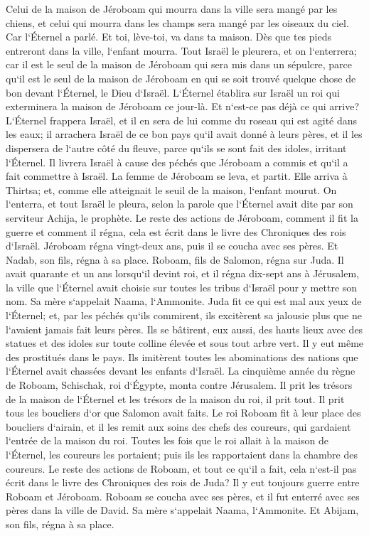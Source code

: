 \verse Celui de la maison de Jéroboam qui mourra dans la ville sera mangé par les chiens, et celui qui mourra dans les champs sera mangé par les oiseaux du ciel. Car l`Éternel a parlé. 
\verse Et toi, lève-toi, va dans ta maison. Dès que tes pieds entreront dans la ville, l`enfant mourra. 
\verse Tout Israël le pleurera, et on l`enterrera; car il est le seul de la maison de Jéroboam qui sera mis dans un sépulcre, parce qu`il est le seul de la maison de Jéroboam en qui se soit trouvé quelque chose de bon devant l`Éternel, le Dieu d`Israël. 
\verse L`Éternel établira sur Israël un roi qui exterminera la maison de Jéroboam ce jour-là. Et n`est-ce pas déjà ce qui arrive? 
\verse L`Éternel frappera Israël, et il en sera de lui comme du roseau qui est agité dans les eaux; il arrachera Israël de ce bon pays qu`il avait donné à leurs pères, et il les dispersera de l`autre côté du fleuve, parce qu`ils se sont fait des idoles, irritant l`Éternel. 
\verse Il livrera Israël à cause des péchés que Jéroboam a commis et qu`il a fait commettre à Israël. 
\verse La femme de Jéroboam se leva, et partit. Elle arriva à Thirtsa; et, comme elle atteignait le seuil de la maison, l`enfant mourut. 
\verse On l`enterra, et tout Israël le pleura, selon la parole que l`Éternel avait dite par son serviteur Achija, le prophète. 
\verse Le reste des actions de Jéroboam, comment il fit la guerre et comment il régna, cela est écrit dans le livre des Chroniques des rois d`Israël. 
\verse Jéroboam régna vingt-deux ans, puis il se coucha avec ses pères. Et Nadab, son fils, régna à sa place. 
\verse Roboam, fils de Salomon, régna sur Juda. Il avait quarante et un ans lorsqu`il devint roi, et il régna dix-sept ans à Jérusalem, la ville que l`Éternel avait choisie sur toutes les tribus d`Israël pour y mettre son nom. Sa mère s`appelait Naama, l`Ammonite. 
\verse Juda fit ce qui est mal aux yeux de l`Éternel; et, par les péchés qu`ils commirent, ils excitèrent sa jalousie plus que ne l`avaient jamais fait leurs pères. 
\verse Ils se bâtirent, eux aussi, des hauts lieux avec des statues et des idoles sur toute colline élevée et sous tout arbre vert. 
\verse Il y eut même des prostitués dans le pays. Ils imitèrent toutes les abominations des nations que l`Éternel avait chassées devant les enfants d`Israël. 
\verse La cinquième année du règne de Roboam, Schischak, roi d`Égypte, monta contre Jérusalem. 
\verse Il prit les trésors de la maison de l`Éternel et les trésors de la maison du roi, il prit tout. Il prit tous les boucliers d`or que Salomon avait faits. 
\verse Le roi Roboam fit à leur place des boucliers d`airain, et il les remit aux soins des chefs des coureurs, qui gardaient l`entrée de la maison du roi. 
\verse Toutes les fois que le roi allait à la maison de l`Éternel, les coureurs les portaient; puis ils les rapportaient dans la chambre des coureurs. 
\verse Le reste des actions de Roboam, et tout ce qu`il a fait, cela n`est-il pas écrit dans le livre des Chroniques des rois de Juda? 
\verse Il y eut toujours guerre entre Roboam et Jéroboam. 
\verse Roboam se coucha avec ses pères, et il fut enterré avec ses pères dans la ville de David. Sa mère s`appelait Naama, l`Ammonite. Et Abijam, son fils, régna à sa place. 

